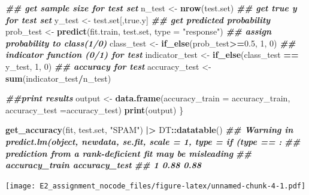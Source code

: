 \documentclass[
]{article}
\newenvironment{Shaded}{\begin{snugshade}}{\end{snugshade}}
\newcommand{\AttributeTok}[1]{\textcolor[rgb]{0.13,0.29,0.53}{#1}}
\newcommand{\DecValTok}[1]{\textcolor[rgb]{0.00,0.00,0.81}{#1}}
\newcommand{\DocumentationTok}[1]{\textcolor[rgb]{0.56,0.35,0.01}{\textbf{\textit{#1}}}}
\newcommand{\FloatTok}[1]{\textcolor[rgb]{0.00,0.00,0.81}{#1}}
\newcommand{\FunctionTok}[1]{\textcolor[rgb]{0.13,0.29,0.53}{\textbf{#1}}}
\newcommand{\NormalTok}[1]{#1}
\newcommand{\OtherTok}[1]{\textcolor[rgb]{0.56,0.35,0.01}{#1}}
\newcommand{\SpecialCharTok}[1]{\textcolor[rgb]{0.81,0.36,0.00}{\textbf{#1}}}
\newcommand{\StringTok}[1]{\textcolor[rgb]{0.31,0.60,0.02}{#1}}
\begin{document}
\begin{Shaded}
\begin{Highlighting}[]
    \DocumentationTok{\#\# get sample size for test set}
\NormalTok{    n\_test }\OtherTok{\textless{}{-}} \FunctionTok{nrow}\NormalTok{(test.set)}
    \DocumentationTok{\#\# get true y for test set}
\NormalTok{    y\_test }\OtherTok{\textless{}{-}}\NormalTok{ test.set[,true.y]}
    \DocumentationTok{\#\# get predicted probability }
\NormalTok{    prob\_test }\OtherTok{\textless{}{-}} \FunctionTok{predict}\NormalTok{(fit.train, test.set, }\AttributeTok{type =} \StringTok{"response"}\NormalTok{)}
    \DocumentationTok{\#\# assign probability to class(1/0)}
\NormalTok{    class\_test }\OtherTok{\textless{}{-}} \FunctionTok{if\_else}\NormalTok{(prob\_test}\SpecialCharTok{\textgreater{}=}\FloatTok{0.5}\NormalTok{, }\DecValTok{1}\NormalTok{, }\DecValTok{0}\NormalTok{)}
    \DocumentationTok{\#\# indicator function (0/1) for test}
\NormalTok{    indicator\_test }\OtherTok{\textless{}{-}} \FunctionTok{if\_else}\NormalTok{(class\_test }\SpecialCharTok{==}\NormalTok{ y\_test, }\DecValTok{1}\NormalTok{, }\DecValTok{0}\NormalTok{)}
    \DocumentationTok{\#\# accuracy for test}
\NormalTok{    accuracy\_test }\OtherTok{\textless{}{-}} \FunctionTok{sum}\NormalTok{(indicator\_test}\SpecialCharTok{/}\NormalTok{n\_test)}
    
    \DocumentationTok{\#\#print results}
\NormalTok{    output }\OtherTok{\textless{}{-}} \FunctionTok{data.frame}\NormalTok{(}\AttributeTok{accuracy\_train =}\NormalTok{ accuracy\_train, }\AttributeTok{accuracy\_test =}\NormalTok{accuracy\_test)}
    \FunctionTok{print}\NormalTok{(output)}
\NormalTok{  \}}

\FunctionTok{get\_accuracy}\NormalTok{(fit, test.set, }\StringTok{"SPAM"}\NormalTok{) }\SpecialCharTok{|\textgreater{}} 
\NormalTok{  DT}\SpecialCharTok{::}\FunctionTok{datatable}\NormalTok{()}
\DocumentationTok{\#\# Warning in predict.lm(object, newdata, se.fit, scale = 1, type = if (type == :}
\DocumentationTok{\#\# prediction from a rank{-}deficient fit may be misleading}
\DocumentationTok{\#\#   accuracy\_train accuracy\_test}
\DocumentationTok{\#\# 1           0.88          0.88}
\end{Highlighting}
\end{Shaded}

\texttt{[image: E2\_assignment\_nocode\_files/figure-latex/unnamed-chunk-4-1.pdf]}
\end{document}
